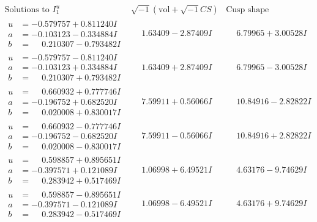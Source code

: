 \documentclass[1p]{elsarticle_modified}
\theoremstyle{definition}
\newcommand{\I}{\sqrt{-1}}
\begin{document}
$$\begin{array}{c|c|c}  
\text{Solutions to }I^u_{1}& \I (\text{vol} + \sqrt{-1}CS) & \text{Cusp shape}\\
 \hline 
\begin{aligned}
u &= -0.579757 + 0.811240 I \\
a &= -0.103123 - 0.334884 I \\
b &= \phantom{-}0.210307 - 0.793482 I\end{aligned}
 & \phantom{-}1.63409 - 2.87409 I & \phantom{-}6.79965 + 3.00528 I \\ \hline\begin{aligned}
u &= -0.579757 - 0.811240 I \\
a &= -0.103123 + 0.334884 I \\
b &= \phantom{-}0.210307 + 0.793482 I\end{aligned}
 & \phantom{-}1.63409 + 2.87409 I & \phantom{-}6.79965 - 3.00528 I \\ \hline\begin{aligned}
u &= \phantom{-}0.660932 + 0.777746 I \\
a &= -0.196752 + 0.682520 I \\
b &= \phantom{-}0.020008 + 0.830017 I\end{aligned}
 & \phantom{-}7.59911 + 0.56066 I & \phantom{-}10.84916 - 2.82822 I \\ \hline\begin{aligned}
u &= \phantom{-}0.660932 - 0.777746 I \\
a &= -0.196752 - 0.682520 I \\
b &= \phantom{-}0.020008 - 0.830017 I\end{aligned}
 & \phantom{-}7.59911 - 0.56066 I & \phantom{-}10.84916 + 2.82822 I \\ \hline\begin{aligned}
u &= \phantom{-}0.598857 + 0.895651 I \\
a &= -0.397571 + 0.121089 I \\
b &= \phantom{-}0.283942 + 0.517469 I\end{aligned}
 & \phantom{-}1.06998 + 6.49521 I & \phantom{-}4.63176 - 9.74629 I \\ \hline\begin{aligned}
u &= \phantom{-}0.598857 - 0.895651 I \\
a &= -0.397571 - 0.121089 I \\
b &= \phantom{-}0.283942 - 0.517469 I\end{aligned}
 & \phantom{-}1.06998 - 6.49521 I & \phantom{-}4.63176 + 9.74629 I \\ \hline\begin{aligned}

\end{aligned}
\end{array}$$
\end{document}
